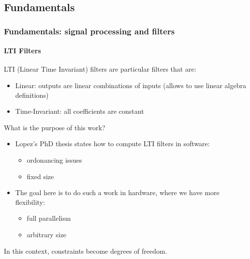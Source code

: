 \subsection{Fundamentals}

\begin{frame}
	\frametitle{Fundamentals: signal processing and filters}
	\framesubtitle{LTI Filters}
	LTI (Linear Time Invariant) filters are particular filters that are:
	\begin{itemize}
		\item Linear: outputs are linear combinations of inputs (allows to use linear algebra definitions)
		\item Time-Invariant: all coefficients are constant
	\end{itemize}

	
\end{frame}

\begin{frame}
	What is the purpose of this work?
	\begin{itemize}
		\item Lopez's PhD thesis states how to compute LTI filters in software:
			\begin{itemize} 
				\item ordonancing issues
				\item fixed size
			\end{itemize} 
		\item The goal here is to do such a work in hardware, where we have more flexibility:
			\begin{itemize} 
				\item full parallelism
				\item arbitrary size
			\end{itemize} 
	\end{itemize}
	In this context, constraints become degrees of freedom.
\end{frame}

